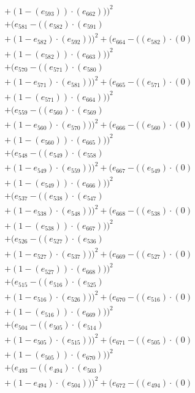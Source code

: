 \documentclass[10pt, a4paper]{article}
\begin{document}
\begin{small}
\begin{align*}
& + (1 - (e_{593})) \cdot (e_{662})))^{2} \\
& + (e_{581} - ((e_{582})  \cdot  (e_{591}) \\
& + (1 - e_{582})  \cdot  (e_{592})))^{2} + (e_{664} - ((e_{582}) \cdot (0) \\
& + (1 - (e_{582})) \cdot (e_{663})))^{2} \\
& + (e_{570} - ((e_{571})  \cdot  (e_{580}) \\
& + (1 - e_{571})  \cdot  (e_{581})))^{2} + (e_{665} - ((e_{571}) \cdot (0) \\
& + (1 - (e_{571})) \cdot (e_{664})))^{2} \\
& + (e_{559} - ((e_{560})  \cdot  (e_{569}) \\
& + (1 - e_{560})  \cdot  (e_{570})))^{2} + (e_{666} - ((e_{560}) \cdot (0) \\
& + (1 - (e_{560})) \cdot (e_{665})))^{2} \\
& + (e_{548} - ((e_{549})  \cdot  (e_{558}) \\
& + (1 - e_{549})  \cdot  (e_{559})))^{2} + (e_{667} - ((e_{549}) \cdot (0) \\
& + (1 - (e_{549})) \cdot (e_{666})))^{2} \\
& + (e_{537} - ((e_{538})  \cdot  (e_{547}) \\
& + (1 - e_{538})  \cdot  (e_{548})))^{2} + (e_{668} - ((e_{538}) \cdot (0) \\
& + (1 - (e_{538})) \cdot (e_{667})))^{2} \\
& + (e_{526} - ((e_{527})  \cdot  (e_{536}) \\
& + (1 - e_{527})  \cdot  (e_{537})))^{2} + (e_{669} - ((e_{527}) \cdot (0) \\
& + (1 - (e_{527})) \cdot (e_{668})))^{2} \\
& + (e_{515} - ((e_{516})  \cdot  (e_{525}) \\
& + (1 - e_{516})  \cdot  (e_{526})))^{2} + (e_{670} - ((e_{516}) \cdot (0) \\
& + (1 - (e_{516})) \cdot (e_{669})))^{2} \\
& + (e_{504} - ((e_{505})  \cdot  (e_{514}) \\
& + (1 - e_{505})  \cdot  (e_{515})))^{2} + (e_{671} - ((e_{505}) \cdot (0) \\
& + (1 - (e_{505})) \cdot (e_{670})))^{2} \\
& + (e_{493} - ((e_{494})  \cdot  (e_{503}) \\
& + (1 - e_{494})  \cdot  (e_{504})))^{2} + (e_{672} - ((e_{494}) \cdot (0) \\

\end{align*}
\end{small}
\end{document}
